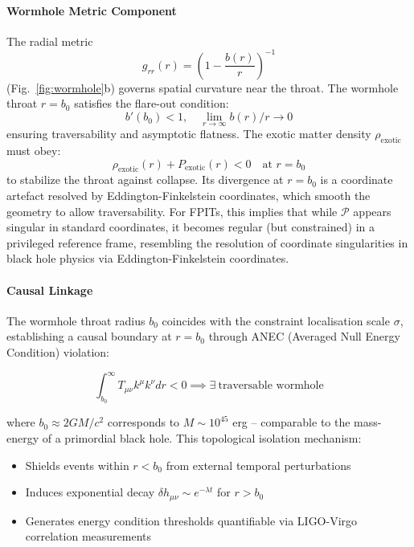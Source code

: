 \documentclass[twocolumn]{article}
\newcommand{\fpit}{\mathcal{P}}
\begin{document}
	\paragraph{Wormhole Metric Component}
	The radial metric
	\begin{equation}
		g_{rr}(r) = \left(1 - \frac{b(r)}{r}\right)^{-1}	
	\end{equation}
	(Fig.~\ref{fig:wormhole}b) governs spatial curvature near the throat. The wormhole throat $r = b_0$ satisfies the flare-out condition:
	\begin{equation}
		b'(b_0) < 1, \quad \lim_{r \to \infty} b(r)/r \to 0
	\end{equation}
	ensuring traversability and asymptotic flatness\cite{visser1995}. The exotic matter density $\rho_{\text{exotic}}$ must obey:
	\begin{equation}
		\rho_{\text{exotic}}(r) + P_{\text{exotic}}(r) < 0 \quad \text{at } r = b_0
	\end{equation}
	to stabilize the throat against collapse. Its divergence at $r = b_0$ is a coordinate artefact resolved by Eddington-Finkelstein coordinates, which smooth the geometry to allow traversability. For FPITs, this implies that while $\fpit$ appears singular in standard coordinates, it becomes regular (but constrained) in a privileged reference frame, resembling the resolution of coordinate singularities in black hole physics via Eddington-Finkelstein coordinates.
	
	
	
	\paragraph{Causal Linkage}
	The wormhole throat radius \(b_0\) coincides with the constraint localisation scale \(\sigma\), establishing a causal boundary at \(r = b_0\) through ANEC (Averaged Null Energy Condition) violation:
	
	\begin{equation}
		\int_{b_0}^\infty T_{\mu\nu}k^\mu k^\nu dr < 0 \implies \exists\ \text{traversable wormhole}
\label{eq:ANEC_violation}
	\end{equation}
	
	where \(b_0 \approx 2GM/c^2\) corresponds to \(M \sim 10^{45}\) erg – comparable to the mass-energy of a primordial black hole. This topological isolation mechanism:
	
	\begin{itemize}
		\item Shields events within \(r < b_0\) from external temporal perturbations
		\item Induces exponential decay \(\delta h_{\mu\nu} \sim e^{-\lambda t}\) for \(r > b_0\)
		\item Generates energy condition thresholds quantifiable via LIGO-Virgo correlation measurements\cite{LIGO2023}
	\end{itemize}
	
\end{document}
